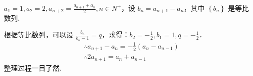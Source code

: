 \begin{example}
    $a_1=1, a_2=2, a_{n+2}=\frac{a_{n+1}+a_n}{2}, n \in N^{+}$，设 $b_n=a_{n+1} - a_n$，其中 $\left\{b_n\right\}$ 是等比数列.
\end{example}

\begin{solution}
    根据等比数列，可以设 $\frac{b_n}{b_n-1}=q$，求得：$b_2=-\frac{1}{2}, b_1=1, q=-\frac{1}{2}$．
    $$
        \begin{aligned}
             & \therefore a_{n+1}-a_n=-\frac{1}{2}\left(a_n-a_{n-1}\right) \\
             & \therefore 2 a_{n+1}=a_n+a_{n-1}
        \end{aligned}
    $$
    整理过程一目了然.
\end{solution}
